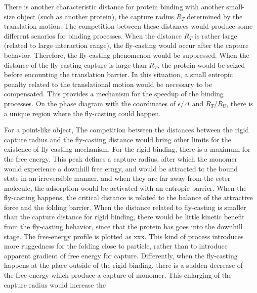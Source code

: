 \documentclass[preprint,preprintnumbers,amsmath,amssymb,showpacs,aps,pre]{revtex4-1}
\begin{document}
There is another characteristic distance for protein binding with another
small-size object (such as another protein), the capture radius $R_T$
determined by the translation motion. The competition between these distances
would produce some different senarios for binding processes. When the
distance $R_T$ is rather large (related to large interaction range), the
fly-casting would occur after the capture behavior. Therefore, the fly-casting
phenomenon would be suppressed. When the distance of the fly-casting capture
is large than $R_T$, the protein would be seized before encounting the
translation barrier. In this situation, a small entropic penalty related to
the translational motion would be necessary to be compensated. This provides a
mechanism for the speedup of the binding processes. On the phase diagram with
the coordinates of $\epsilon/\Delta$ and $R_T/R_U$, there is a unique region
where the fly-casting could happen. 

For a point-like object,
The competition between the distances between the rigid capture radius and the
fly-casting distance would bring other limits for the existence of fly-casting
mechanism. For the rigid binding, there is a maximum for the free energy.
This peak defines a capture radius, after which the monomer would experience a
downhill free erngy, and would be attracted to the bound state in an
irreversible manner, and when they are far away from the ceter molecule, the
adsorption would be activated with an entropic barrier. When the fly-casting
happens, the critical distance is related to the balance of the attractive
force and the folding barrier. When the distance related to fly-casting is
smaller than the capture distance for rigid binding, there would be little
kinetic benefit from the fly-casting behavior, since that the protein has goes
into the downhill stage. The free-energy profile is plotted as xxx. This kind
of process introduces more ruggedness for the folding close to particle,
rather than to introduce apparent gradient of free energy for capture.
Differently, when the fly-casting happens at the place outside of the rigid
binding, there is a sudden decrease of the free energy which produce a capture
of monomer. This enlarging of the capture radius would increase the 
\end{document}

